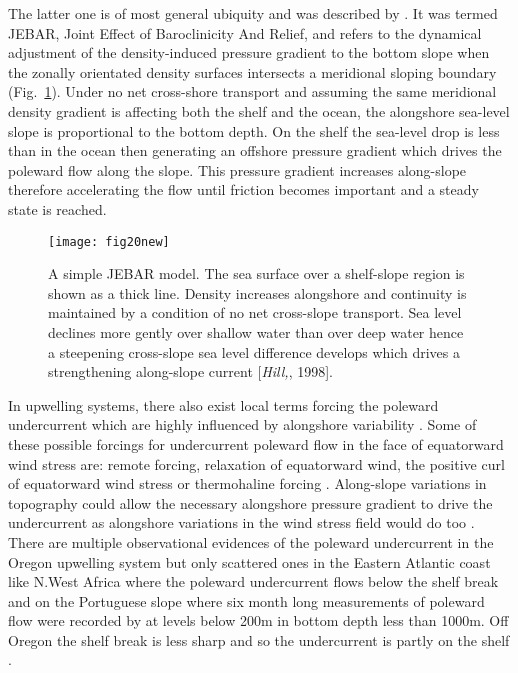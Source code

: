 The latter one is of most general ubiquity and was described by
\citet{Huthnance84}. It was termed JEBAR, Joint Effect of
Baroclinicity And Relief, and refers to the dynamical adjustment
of the density-induced pressure gradient to the bottom slope when
the zonally orientated density surfaces intersects a meridional
sloping boundary (Fig.~\ref{fig:jebar}). Under no net cross-shore
transport and assuming the same meridional density gradient is
affecting both the shelf and the ocean, the alongshore sea-level
slope is proportional to the bottom depth. On the shelf the
sea-level drop is less than in the ocean then generating an
offshore pressure gradient which drives the poleward flow along
the slope. This pressure gradient increases along-slope therefore
accelerating the flow until friction becomes important and a
steady state is reached.
\begin{figure}
  \centering
  \texttt{[image: fig20new]}
  \caption{A simple JEBAR model. The sea surface over a
  shelf-slope region is shown as a thick line. Density increases
  alongshore and continuity is maintained by a condition of no net
  cross-slope transport. Sea level declines more gently over
  shallow water than over deep water hence a steepening
  cross-slope sea level difference develops which drives a
  strengthening along-slope current
  [{\it Hill,}, 1998].}
  \label{fig:jebar}
\end{figure}


In upwelling systems, there also exist local terms forcing the
poleward undercurrent which are highly influenced by alongshore
variability \citep{Hill98}. Some of these possible forcings for
undercurrent poleward flow in the face of equatorward wind stress
are: remote forcing, relaxation of equatorward wind, the positive
curl of equatorward wind stress or thermohaline forcing
\citep{McCreary87}. Along-slope variations in topography could
allow the necessary alongshore pressure gradient to drive the
undercurrent as alongshore variations in the wind stress field
would do too \citep{Hill98}. There are multiple observational
evidences of the poleward undercurrent in the Oregon upwelling
system but only scattered ones in the Eastern Atlantic coast like
N.West Africa where the poleward undercurrent flows below the
shelf break \citep{Mittelstaed75,Barton90} and on the Portuguese
slope where six month long measurements of poleward flow were
recorded by \citet{Ambar84,Ambar85} at levels below 200m in bottom
depth less than 1000m. Off Oregon the shelf break is less sharp
and so the undercurrent is partly on the shelf \citep{Huyer76}.
